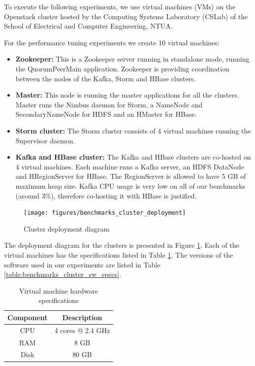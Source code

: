 To execute the following experiments, we use virtual machines (VMs) on the Openstack cluster hosted by the Computing Systems Laboratory (CSLab) of the School of Electrical and Computer Engineering, NTUA. 

For the performance tuning experiments we create 10 virtual machines:
\begin{itemize}
\item \textbf{Zookeeper:} This is a Zookeeper server running in standalone mode, running the QuorumPeerMain application. Zookeeper is providing coordination between the nodes of the Kafka, Storm and HBase clusters.
\item \textbf{Master:} This node is running the master applications for all the clusters. Master runs the Nimbus daemon for Storm, a NameNode and SecondaryNameNode for HDFS and an HMaster for HBase.
\item \textbf{Storm cluster:} The Storm cluster consists of 4 virtual machines running the Supervisor daemon.
\item \textbf{Kafka and HBase cluster:} The Kafka and HBase clusters are co-hosted on 4 virtual machines. Each machine runs a Kafka server, an HDFS DataNode and HRegionServer for HBase. The RegionServer is allowed to have 5 GB of maximum heap size. Kafka CPU usage is very low on all of our benchmarks (around 3\%), therefore co-hosting it with HBase is justified.
\end{itemize}

\begin{figure}[H]
\centering
\texttt{[image: figures/benchmarks\_cluster\_deployment]}
\caption{Cluster deployment diagram}
\label{figure:benchmarks_cluster_deployment}
\end{figure}

The deployment diagram for the clusters is presented in Figure \ref{figure:benchmarks_cluster_deployment}. Each of the virtual machines has the specifications listed in Table \ref{table:benchmarks_cluster_hw_specs}. The versions of the software used in our experiments are listed in Table \ref{table:benchmarks_cluster_sw_specs}.

\begin{table}[H]
\centering
\begin{tabular}{ |c|c| }
\hline
Component & Description \\ \hline \hline
CPU & 4 cores @ 2.4 GHz \\ \hline
RAM & 8 GB \\ \hline
Disk & 80 GB \\ \hline
\end{tabular}
\caption{Virtual machine hardware specifications}
\label{table:benchmarks_cluster_hw_specs}
\end{table}

